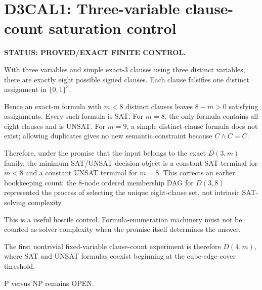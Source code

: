 \section*{D3CAL1: Three-variable clause-count saturation control}
\textbf{STATUS: PROVED/EXACT FINITE CONTROL.}

With three variables and simple exact-3 clauses using three distinct variables, there are exactly eight possible signed clauses. Each clause falsifies one distinct assignment in \(\{0,1\}^3\).

Hence an exact-m formula with \(m<8\) distinct clauses leaves \(8-m>0\) satisfying assignments. Every such formula is SAT. For \(m=8\), the only formula contains all eight clauses and is UNSAT. For \(m=9\), a simple distinct-clause formula does not exist; allowing duplicates gives no new semantic constraint because \(C\wedge C=C\).

Therefore, under the promise that the input belongs to the exact \(D(3,m)\) family, the minimum SAT/UNSAT decision object is a constant SAT terminal for \(m<8\) and a constant UNSAT terminal for \(m=8\). This corrects an earlier bookkeeping count: the 8-node ordered membership DAG for \(D(3,8)\) represented the process of selecting the unique eight-clause set, not intrinsic SAT-solving complexity.

This is a useful hostile control. Formula-enumeration machinery must not be counted as solver complexity when the promise itself determines the answer.

The first nontrivial fixed-variable clause-count experiment is therefore \(D(4,m)\), where SAT and UNSAT formulas coexist beginning at the cube-edge-cover threshold.

P versus NP remains OPEN.
